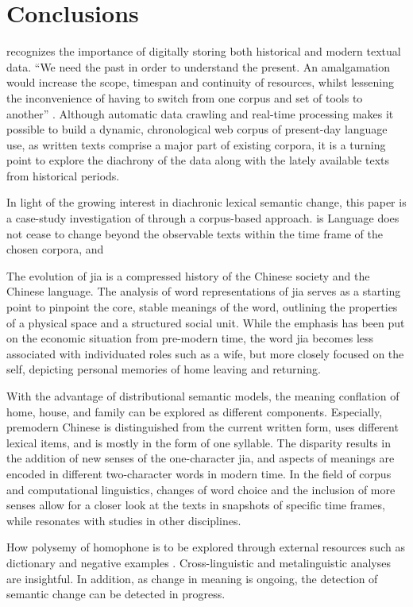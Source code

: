 

\chapter{Conclusions}
\textcite{renouf2002time} recognizes the importance of digitally storing both historical and modern textual data. ``We need the past in order to understand the present. An amalgamation would increase the scope, timespan and continuity of resources, whilst lessening the inconvenience of having to switch from one corpus and set of tools to another'' \parencite{renouf2002time}. Although automatic data crawling and real-time processing makes it possible to build a dynamic, chronological web corpus of present-day language use, as written texts comprise a major part of existing corpora, it is a turning point to explore the diachrony of the data along with the lately available texts from historical periods.

In light of the growing interest in diachronic lexical semantic change, this paper is a case-study investigation of \jia through a corpus-based approach. is Language does not cease to change beyond the observable texts within the time frame of the chosen corpora, and  

The evolution of jia is a compressed history of the Chinese society and the Chinese language. The analysis of word representations of jia serves as a starting point to pinpoint the core, stable meanings of the word, outlining the properties of a physical space and a structured social unit. While the emphasis has been put on the economic situation from pre-modern time, the word jia becomes less associated with individuated roles such as a wife, but more closely focused on the self, depicting personal memories of home leaving and returning. 

With the advantage of distributional semantic models, the meaning conflation of home, house, and family can be explored as different components. Especially, premodern Chinese is distinguished from the current written form, uses different lexical items, and is mostly in the form of one syllable. The disparity results in the addition of new senses of the one-character jia, and aspects of meanings are encoded in different two-character words in modern time. In the field of corpus and computational linguistics, changes of word choice and the inclusion of more senses allow for a closer look at the texts in snapshots of specific time frames, while resonates with studies in other disciplines.

How polysemy of homophone is to be explored through external resources such as dictionary and negative examples \textcite[15]{traugott2001regularity}.  Cross-linguistic and metalinguistic analyses are insightful. In addition, as change in meaning is ongoing, the detection of semantic change can be detected in progress.
